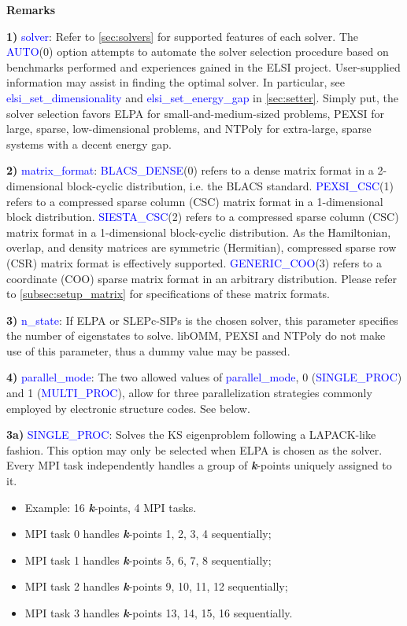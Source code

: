 \documentclass{report}
\begin{document}
\textbf{Remarks}

\textbf{1)} \textcolor{blue}{solver}:  Refer to \ref{sec:solvers} for supported features of each solver.  The \textcolor{blue}{AUTO}(0) option attempts to automate the solver selection procedure based on benchmarks performed and experiences gained in the ELSI project.  User-supplied information may assist in finding the optimal solver.  In particular, see \textcolor{blue}{elsi\_set\_dimensionality} and \textcolor{blue}{elsi\_set\_energy\_gap} in \ref{sec:setter}.  Simply put, the solver selection favors ELPA for small-and-medium-sized problems, PEXSI for large, sparse, low-dimensional problems, and NTPoly for extra-large, sparse systems with a decent energy gap.

\textbf{2)} \textcolor{blue}{matrix\_format}:  \textcolor{blue}{BLACS\_DENSE}(0) refers to a dense matrix format in a 2-dimensional block-cyclic distribution, i.e. the BLACS standard.  \textcolor{blue}{PEXSI\_CSC}(1) refers to a compressed sparse column (CSC) matrix format in a 1-dimensional block distribution.  \textcolor{blue}{SIESTA\_CSC}(2) refers to a compressed sparse column (CSC) matrix format in a 1-dimensional block-cyclic distribution.  As the Hamiltonian, overlap, and density matrices are symmetric (Hermitian), compressed sparse row (CSR) matrix format is effectively supported.  \textcolor{blue}{GENERIC\_COO}(3) refers to a coordinate (COO) sparse matrix format in an arbitrary distribution.  Please refer to \ref{subsec:setup_matrix} for specifications of these matrix formats.

\textbf{3)} \textcolor{blue}{n\_state}:  If ELPA or SLEPc-SIPs is the chosen solver, this parameter specifies the number of eigenstates to solve.  libOMM, PEXSI and NTPoly do not make use of this parameter, thus a dummy value may be passed.

\textbf{4)} \textcolor{blue}{parallel\_mode}:  The two allowed values of \textcolor{blue}{parallel\_mode}, 0 (\textcolor{blue}{SINGLE\_PROC}) and 1 (\textcolor{blue}{MULTI\_PROC}), allow for three parallelization strategies commonly employed by electronic structure codes.  See below.

\textbf{3a)} \textcolor{blue}{SINGLE\_PROC}:  Solves the KS eigenproblem following a LAPACK-like fashion.  This option may only be selected when ELPA is chosen as the solver.  Every MPI task independently handles a group of \textbf{\textit{k}}-points uniquely assigned to it.
\begin{itemize}
\item Example:  16 \textbf{\textit{k}}-points, 4 MPI tasks.
\item MPI task 0 handles \textbf{\textit{k}}-points 1, 2, 3, 4 sequentially;
\item MPI task 1 handles \textbf{\textit{k}}-points 5, 6, 7, 8 sequentially;
\item MPI task 2 handles \textbf{\textit{k}}-points 9, 10, 11, 12 sequentially;
\item MPI task 3 handles \textbf{\textit{k}}-points 13, 14, 15, 16 sequentially.
\end{itemize}
\end{document}
